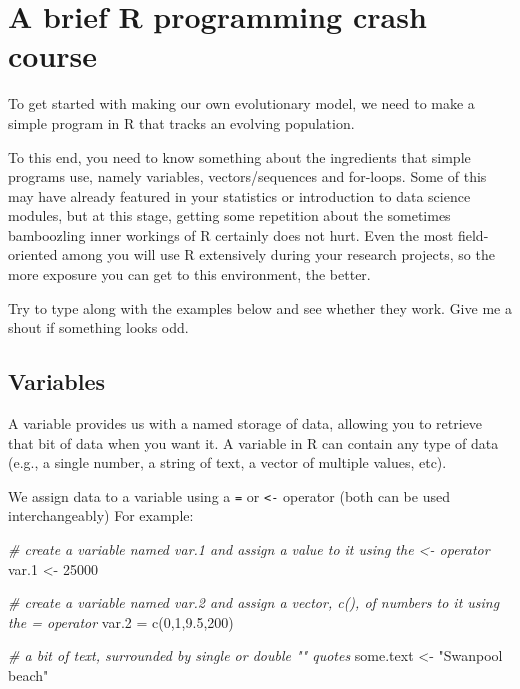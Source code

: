 \documentclass[
]{book}
\newenvironment{Shaded}{\begin{snugshade}}{\end{snugshade}}
\newcommand{\CommentTok}[1]{\textcolor[rgb]{0.56,0.35,0.01}{\textit{#1}}}
\newcommand{\DecValTok}[1]{\textcolor[rgb]{0.00,0.00,0.81}{#1}}
\newcommand{\FloatTok}[1]{\textcolor[rgb]{0.00,0.00,0.81}{#1}}
\newcommand{\FunctionTok}[1]{\textcolor[rgb]{0.00,0.00,0.00}{#1}}
\newcommand{\NormalTok}[1]{#1}
\newcommand{\OtherTok}[1]{\textcolor[rgb]{0.56,0.35,0.01}{#1}}
\newcommand{\StringTok}[1]{\textcolor[rgb]{0.31,0.60,0.02}{#1}}
\begin{document}
\hypertarget{a-brief-r-programming-crash-course}{%
\chapter{A brief R programming crash course}\label{a-brief-r-programming-crash-course}}

To get started with making our own evolutionary model, we need to make a simple program in R that tracks an evolving population.

To this end, you need to know something about the ingredients that simple programs use, namely variables, vectors/sequences and for-loops. Some of this may have already featured in your statistics or introduction to data science modules, but at this stage, getting some repetition about the sometimes bamboozling inner workings of R certainly does not hurt. Even the most field-oriented among you will use R extensively during your research projects, so the more exposure you can get to this environment, the better.

Try to type along with the examples below and see whether they work. Give me a shout if something looks odd.

\hypertarget{variables}{%
\section{Variables}\label{variables}}

A variable provides us with a named storage of data, allowing you to retrieve that bit of data when you want it. A variable in R can contain any type of data (e.g., a single number, a string of text, a vector of multiple values, etc).

We assign data to a variable using a \texttt{=} or \texttt{\textless{}-} operator (both can be used interchangeably) For example:

\begin{Shaded}
\begin{Highlighting}[]
\CommentTok{\# create a variable named var.1 and assign a value to it using the \textless{}{-} operator}
\NormalTok{var}\FloatTok{.1} \OtherTok{\textless{}{-}} \DecValTok{25000}

\CommentTok{\# create a variable named var.2 and assign a vector, c(), of numbers to it using the = operator}
\NormalTok{var}\FloatTok{.2} \OtherTok{=} \FunctionTok{c}\NormalTok{(}\DecValTok{0}\NormalTok{,}\DecValTok{1}\NormalTok{,}\FloatTok{9.5}\NormalTok{,}\DecValTok{200}\NormalTok{)}

\CommentTok{\# a bit of text, surrounded by single \textquotesingle{}\textquotesingle{} or double "" quotes}
\NormalTok{some.text }\OtherTok{\textless{}{-}} \StringTok{"Swanpool beach"}
\end{Highlighting}
\end{Shaded}
\end{document}
